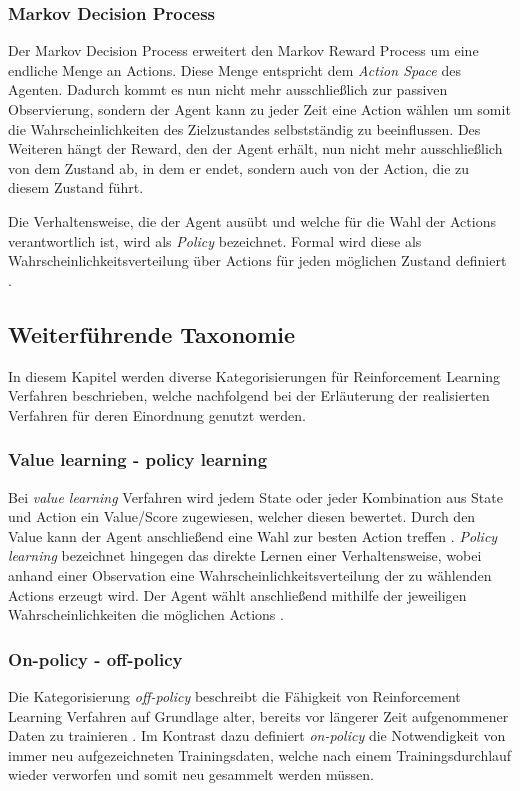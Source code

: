 \documentclass[11pt]{scrartcl}
\begin{document}
\subsubsection{Markov Decision Process}
Der Markov Decision Process erweitert den Markov Reward Process um eine endliche Menge an Actions.
Diese Menge entspricht dem \textit{Action Space} des Agenten. Dadurch kommt es nun nicht mehr
ausschließlich zur passiven Observierung, sondern der Agent kann zu jeder Zeit eine Action wählen um
somit die Wahrscheinlichkeiten des Zielzustandes selbstständig zu beeinflussen. Des Weiteren hängt 
der Reward, den der Agent erhält, nun nicht mehr ausschließlich von dem Zustand ab, in dem er endet,
sondern auch von der Action, die zu diesem Zustand führt. 

Die Verhaltensweise, die der Agent ausübt und welche für die Wahl der Actions verantwortlich ist,
wird als \textit{Policy} bezeichnet. Formal wird diese als Wahrscheinlichkeitsverteilung
über Actions für jeden möglichen Zustand definiert \cite[~S.22 f.]{L2018}.  %


\subsection{Weiterführende Taxonomie}
In diesem Kapitel werden diverse Kategorisierungen für Reinforcement Learning Verfahren beschrieben,
welche nachfolgend bei der Erläuterung der realisierten Verfahren für deren Einordnung genutzt werden.  


\subsubsection{Value learning - policy learning}
Bei \textit{value learning} Verfahren wird jedem State oder jeder Kombination aus State und Action ein
Value/Score zugewiesen, welcher diesen bewertet. Durch den Value kann der Agent anschließend eine
Wahl zur besten Action treffen \cite[~S.NA]{L2018}. \textit{Policy learning} bezeichnet hingegen das
direkte Lernen einer Verhaltensweise, wobei anhand einer Observation eine Wahrscheinlichkeitsverteilung
der zu wählenden Actions erzeugt wird. Der Agent wählt anschließend mithilfe der jeweiligen
Wahrscheinlichkeiten die möglichen Actions \cite[~S.NA]{L2018}.


\subsubsection{On-policy - off-policy}
Die Kategorisierung \textit{off-policy} beschreibt die Fähigkeit von Reinforcement Learning Verfahren auf
Grundlage alter, bereits vor längerer Zeit aufgenommener Daten zu trainieren \cite[~S.NA]{L2018}. 
Im Kontrast dazu definiert \textit{on-policy} die Notwendigkeit von immer neu aufgezeichneten 
Trainingsdaten, welche nach einem Trainingsdurchlauf wieder verworfen und somit neu gesammelt
werden müssen.
\end{document}

